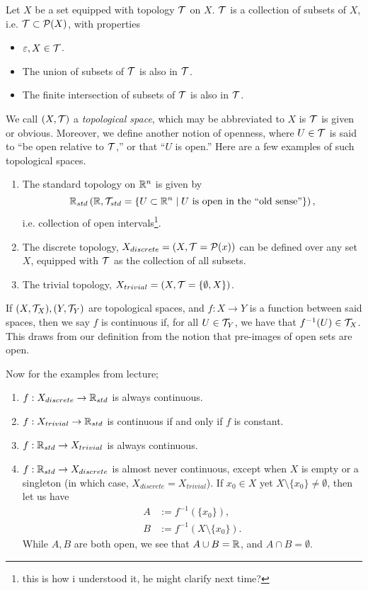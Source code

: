 \begin{definition}
    Let $X$ be a set equipped with topology $\mathcal T$ on $X$. $\mathcal T$ is a collection of subsets of $X$, i.e. $\mathcal T \subset \mathcal P(X)$, with properties
    \begin{itemize}
        \item $\varepsilon, X \in \mathcal T$.
        \item The union of subsets of $\mathcal T$ is also in $\mathcal T$.
        \item The finite intersection of subsets of $\mathcal T$ is also in $\mathcal T$.
    \end{itemize}
\end{definition}
\noindent We call $(X, \mathcal T)$ a \textit{topological space}, which may be abbreviated to $X$ is $\mathcal T$ is given or obvious. Moreover, we define another notion of openness, where $U \in \mathcal T$ is said to ``be open relative to $\mathcal T$,'' or that ``$U$ is open.'' Here are a few examples of such topological spaces.
\begin{enumerate}[label=(\alph*)]
    \item The standard topology on $\mathbb R^n$ is given by
    \[ \mathbb R_{std} \left(\mathbb R, \mathcal T_{std} = \{ U \subset \mathbb R^n \mid U \text{ is open in the ``old sense''}\}\right), \]
    i.e. collection of open intervals\footnote{this is how i understood it, he might clarify next time?}.
    \item The discrete topology, $X_{discrete} = (X, \mathcal T = \mathcal P(x))$ can be defined over any set $X$, equipped with $\mathcal T$ as the collection of all subsets.
    \item The trivial topology, $X_{trivial} = (X, \mathcal T = \{\emptyset, X\})$.
\end{enumerate}

\begin{definition}
    If $(X, \mathcal T_X), (Y, \mathcal T_Y)$ are topological spaces, and $f : X \to Y$ is a function between said spaces, then we say $f$ is continuous if, for all $U \in \mathcal T_Y$, we have that $f^{-1}(U) \in \mathcal T_X$. This draws from our definition from the notion that pre-images of open sets are open.
\end{definition}

\noindent Now for the examples from lecture;
\begin{enumerate}[label=(\alph*)]
    \item $f : X_{discrete} \to \mathbb R_{std}$ is always continuous.
    \item $f : X_{trivial} \to \mathbb R_{std}$ is continuous if and only if $f$ is constant.
    \item $f : \mathbb R_{std} \to X_{trivial}$ is always continuous.
    \item $f : \mathbb R_{std} \to X_{discrete}$ is almost never continuous, except when $X$ is empty or a singleton (in which case, $X_{discrete} = X_{trivial}$). If $x_0 \in X$ yet $X \setminus \{x_0\} \neq \emptyset$, then let us have
    \begin{align*}
        A &:= f^{-1}(\{x_0\}), \\
        B &:= f^{-1}(X \setminus \{x_0\}).
    \end{align*} 
    While $A, B$ are both open, we see that $A \cup B = \mathbb R$, and $A \cap B = \emptyset$.
\end{enumerate}
